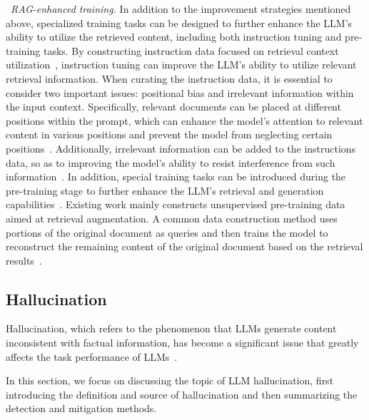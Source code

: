 \textbullet~\emph{RAG-enhanced training.} In addition to the improvement strategies mentioned above, specialized training tasks can be designed to further enhance the LLM's ability to utilize the retrieved content, including both instruction tuning and pre-training tasks. By constructing instruction data focused on retrieval context utilization~\cite{luo-arxiv-2023-sail},  instruction tuning can improve the LLM's ability to utilize relevant retrieval information. When curating the instruction data, {it is essential to consider two important issues: positional bias and irrelevant information within the input context}. Specifically, relevant documents can be placed at different positions within the prompt, which can enhance the model's attention to relevant content in various positions and prevent the model from neglecting certain positions~\cite{Liu-arxiv-2023-Lost}. Additionally,  irrelevant information can be added to the instructions data, so as to improving the model's ability to resist interference from such information~\cite{lin-arxiv-2023-ra}. In addition, special training tasks can be introduced during the pre-training stage to further enhance the LLM's retrieval and generation capabilities~\cite{guu-PMLR-2020-retrieval, Lewis-NeurIPS-2020-Retrieval}. Existing work mainly constructs unsupervised pre-training data aimed at retrieval augmentation. A common data construction method uses portions of the original document as queries and then trains the model to reconstruct the remaining content of the original document based on the retrieval results~\cite{lee-ACL-2019-latent}. 

\subsection{Hallucination}
Hallucination, which refers to the phenomenon that LLMs generate content inconsistent with factual information, has become a significant issue that greatly affects the task performance of LLMs~\cite{Li-arxiv-2024-dawn}.

In this section, we focus on discussing the topic of LLM hallucination, first introducing the definition and source of hallucination and then summarizing the detection and mitigation methods.

